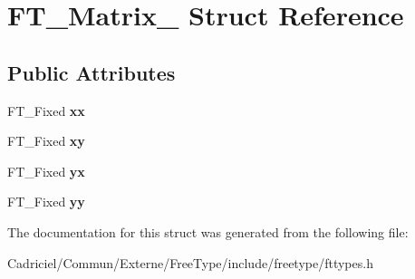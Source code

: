 \hypertarget{struct_f_t___matrix__}{\section{F\-T\-\_\-\-Matrix\-\_\- Struct Reference}
\label{struct_f_t___matrix__}
}
\subsection*{Public Attributes}
\begin{DoxyCompactItemize}
\item 
\hypertarget{struct_f_t___matrix___a27d51c2958634abe7bf377610e095f74}{F\-T\-\_\-\-Fixed {\bfseries xx}}\label{struct_f_t___matrix___a27d51c2958634abe7bf377610e095f74}

\item 
\hypertarget{struct_f_t___matrix___a7e9f439d37c00ba1a11919bcaa8937a2}{F\-T\-\_\-\-Fixed {\bfseries xy}}\label{struct_f_t___matrix___a7e9f439d37c00ba1a11919bcaa8937a2}

\item 
\hypertarget{struct_f_t___matrix___a55792583a843a1611b43c40534a02a17}{F\-T\-\_\-\-Fixed {\bfseries yx}}\label{struct_f_t___matrix___a55792583a843a1611b43c40534a02a17}

\item 
\hypertarget{struct_f_t___matrix___a689a6fd20a88238788b90c3597ee0c2a}{F\-T\-\_\-\-Fixed {\bfseries yy}}\label{struct_f_t___matrix___a689a6fd20a88238788b90c3597ee0c2a}

\end{DoxyCompactItemize}


The documentation for this struct was generated from the following file\-:\begin{DoxyCompactItemize}
\item 
Cadriciel/\-Commun/\-Externe/\-Free\-Type/include/freetype/fttypes.\-h\end{DoxyCompactItemize}
